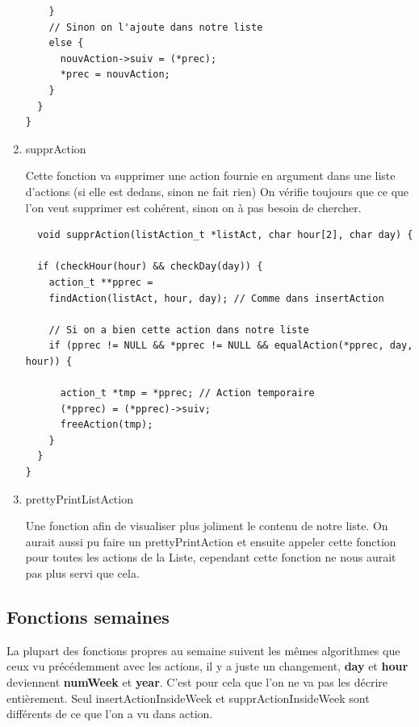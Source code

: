 \documentclass[11pt]{article}
\begin{document}
\begin{enumerate}
\begin{lstlisting}
    }
    // Sinon on l'ajoute dans notre liste
    else {
      nouvAction->suiv = (*prec);
      *prec = nouvAction;
    }
  }
}
\end{lstlisting}


\item supprAction
\label{sec:orge3c0ce6}

Cette fonction va supprimer une action fournie en argument dans une liste
d'actions
(si elle est dedans, sinon ne fait rien)
On vérifie toujours que ce que l'on veut supprimer est cohérent, sinon on à
pas besoin de chercher.

\begin{lstlisting}
  void supprAction(listAction_t *listAct, char hour[2], char day) {

  if (checkHour(hour) && checkDay(day)) {
    action_t **pprec =
	findAction(listAct, hour, day); // Comme dans insertAction

    // Si on a bien cette action dans notre liste
    if (pprec != NULL && *pprec != NULL && equalAction(*pprec, day, hour)) {

      action_t *tmp = *pprec; // Action temporaire
      (*pprec) = (*pprec)->suiv;
      freeAction(tmp);
    }
  }
}
\end{lstlisting}


\item prettyPrintListAction
\label{sec:org7bef069}

Une fonction afin de visualiser plus joliment le contenu de notre
liste.
On aurait aussi pu faire un prettyPrintAction et ensuite appeler cette
fonction pour toutes les actions de la Liste, cependant cette fonction ne
nous aurait pas plus servi que cela.
\end{enumerate}


\subsection{Fonctions semaines}
\label{sec:org19d1616}

La plupart des fonctions propres au semaine suivent les mêmes algorithmes que
ceux vu précédemment avec les actions, il y a juste un changement, \textbf{day}
et \textbf{hour} deviennent \textbf{numWeek} et \textbf{year}. C'est pour cela que l'on ne va pas
les décrire entièrement. Seul insertActionInsideWeek et supprActionInsideWeek
sont différents de ce que l'on a vu dans action.
\end{document}
